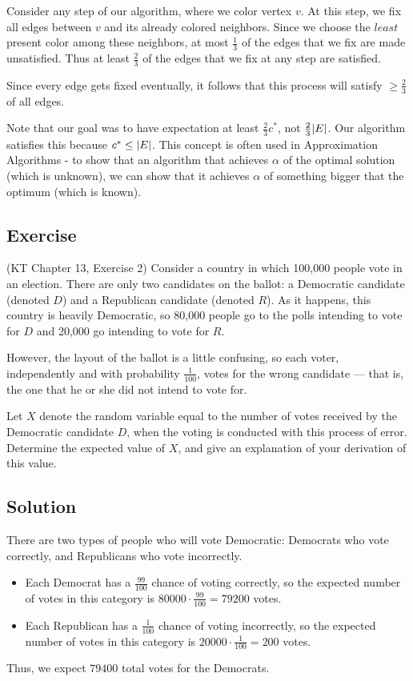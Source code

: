 \documentclass{article}
\newcounter{counter}
\newcommand{\Exercise}{Exercise \stepcounter{counter}\thecounter}
\DeclarePairedDelimiter\abs{\lvert}{\rvert}%
\begin{document}
    \vspace{3mm}
    Consider any step of our algorithm, where we color vertex $v$.
    At this step, we fix all edges between $v$ and its already
    colored neighbors. Since we choose the $least$ present color among these neighbors, at most $\frac{1}{3}$ of the edges that we fix are made unsatisfied.
    Thus at least $\frac23$ of the edges that we fix at any step are satisfied.

    \vspace{3mm}
    Since every edge gets fixed eventually, it follows that this process will satisfy $\geq \frac23$ of all edges.

    Note that our goal was to have expectation at least
    $\frac{2}{3} c^{*}$, not $\frac{2}{3} \abs{E}$. Our algorithm satisfies this
    because $c^* \leq \abs{E}$. This concept is often used in Approximation
    Algorithms - to show that an algorithm that achieves $\alpha$ of the optimal
    solution (which is unknown), we can show that it achieves $\alpha$ of
    something bigger that the optimum (which is known).

\subsection*{\Exercise}
    (KT Chapter 13, Exercise 2)  Consider a country in which 100,000 people vote in an election.  There are only two candidates on the ballot:  a Democratic candidate (denoted $D$) and a Republican candidate (denoted $R$). As it
    happens, this country is heavily Democratic, so 80,000 people go to the polls intending to vote for $D$ and 20,000 go intending to vote for $R$.
    
    \vspace{2mm}
    However, the layout of the ballot is a little confusing, so each voter,
    independently and with probability $\frac1{100}$, votes for the wrong
    candidate --- that is, the one that he or she did not intend to vote for. 
    
    \vspace{2mm}
    Let $X$ denote the random variable equal to the number of votes received by the Democratic candidate $D$, when the voting is conducted with this process of error.  Determine the expected value of $X$, and give an explanation of your derivation of this value. 

\subsection*{Solution}
    There are two types of people who will vote Democratic: Democrats who vote correctly, and Republicans who vote incorrectly.
    \begin{itemize}
    \item Each Democrat has a $\frac{99}{100}$ chance of voting correctly, so the expected number of votes in this category is $80000 \cdot \frac{99}{100} = 79200$ votes.
    \item Each Republican has a $\frac{1}{100}$ chance of voting incorrectly, so the expected number of votes in this category is $20000 \cdot \frac{1}{100} = 200$ votes.
    \end{itemize}
    Thus, we expect $79400$ total votes for the Democrats.
    
\end{document}
